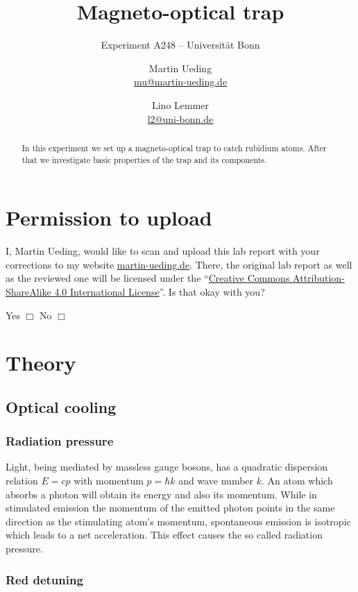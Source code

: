 \documentclass[11pt, english, fleqn, DIV=15, headinclude, BCOR=2cm]{scrreprt}
\title{Magneto-optical trap}
\subtitle{Experiment A248 -- Universität Bonn}
\author{%
    Martin Ueding \\
    \small{\href{mailto:mu@martin-ueding.de}{mu@martin-ueding.de}}
    \and
    Lino Lemmer \\
    \small{\href{mailto:l2@uni-bonn.de}{l2@uni-bonn.de}}
}
\date{\daterange{2016-04-25}{2016-04-26}}
\begin{document}
\maketitle

\begin{abstract}
    In this experiment we set up a magneto-optical trap to catch rubidium
    atoms. After that we investigate basic properties of the trap and its
    components.
\end{abstract}

\tableofcontents

\chapter*{Permission to upload}

I, Martin Ueding, would like to scan and upload this lab report with your
corrections to my website \href{http://martin-ueding.de}{martin-ueding.de}.
There, the original lab report as well as the reviewed one will be licensed
under the “\href{http://creativecommons.org/licenses/by-sa/4.0/}{Creative
Commons Attribution-ShareAlike 4.0 International License}”. Is that okay with
you?

Yes $\Box$ \hspace{2cm} No $\Box$

\chapter{Theory}

\section{Optical cooling}

\subsection{Radiation pressure}

Light, being mediated by massless gauge bosons, has a quadratic dispersion
relation $E = cp$ with momentum $p = \hbar k$ and wave number $k$. An atom
which absorbs a photon will obtain its energy and also its momentum. While in
stimulated emission the momentum of the emitted photon points in the same
direction as the stimulating atom's momentum, spontaneous emission is isotropic
which leads to a net acceleration. This effect causes the so called radiation pressure.

\subsection{Red detuning}
\end{document}
